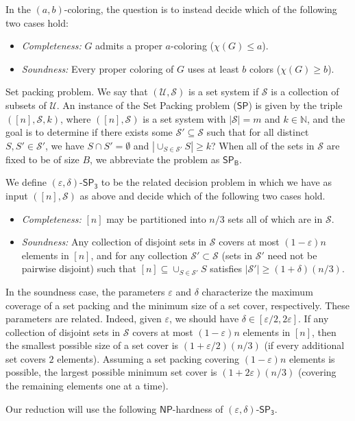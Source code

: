 \documentclass{theoretics}
\newcommand{\1}{\textbf{1}}
\newcommand{\setp}{$\mathsf{SP}$\xspace}
\newcommand{\setpT}{$\mathsf{SP_3}$\xspace}
\newcommand{\setpB}{$\mathsf{SP_B}$\xspace}
\newcommand{\np}{$\mathsf{NP}$\xspace}
\begin{document}
In the $(a, b)$-coloring, the question is to instead decide which of the following two cases hold:
\begin{itemize}
    \item \textit{Completeness:} $G$ admits a proper $a$-coloring ($\chi(G) \leq a$).
    \item \textit{Soundness:} Every proper coloring of $G$ uses at least $b$ colors  ($\chi(G) \geq b$).
\end{itemize}

\begin{paragraph}{Set packing problem.}
We say that $(\mathcal{U}, \mathcal{S})$ is a set system if $\mathcal{S}$ is a collection of subsets of $\mathcal{U}$.
An instance of the Set Packing problem (\setp) is given by the triple $([n], \mathcal{S}, k)$, where $([n], \mathcal{S})$ is a set system with $|\mathcal{S}| = m$ and $k \in \mathbb{N}$, and the goal is to determine if there exists some $\mathcal{S}' \subseteq \mathcal{S}$ such that for all distinct $S, S' \in \mathcal{S}'$, we have $S \cap S' = \emptyset$ and   $|\cup_{S \in \mathcal{S}'} S| \geq k$? When all of the sets in $\mathcal{S}$ are fixed to be of size $B$, we abbreviate the problem as \setpB. 

We define $(\varepsilon, \delta)$-\setpT to be the related decision problem in which we have as input $([n], \mathcal{S})$ as above and decide which of the following two cases hold.
\begin{itemize}
    \item \textit{Completeness:} $[n]$ may be partitioned into $n/3$ sets all of which are in $\mathcal{S}$.
    \item \textit{Soundness:} Any collection of disjoint sets in $\mathcal{S}$ covers at most $(1-\varepsilon)n$ elements in $[n]$, and for any collection $\mathcal{S}' \subset \mathcal{S}$ (sets in $\mathcal{S}'$ need not be pairwise disjoint) such that $[n] \subseteq \cup_{S \in \mathcal{S}'} S$ satisfies $|\mathcal{S}'| \geq (1 + \delta)(n/3)$.
\end{itemize}


\begin{remark}In the soundness case, the parameters $\varepsilon$ and $\delta$ characterize the maximum coverage of a set packing and the minimum size of a set cover, respectively. These parameters are related. Indeed, given $\varepsilon$, we should have $\delta \in [\varepsilon/2, 2\varepsilon]$. If any collection of disjoint sets in $\mathcal{S}$ covers at most $(1-\varepsilon)n$ elements in $[n]$, then the smallest possible size of a set cover is $(1 + \varepsilon/2)(n/3)$ (if every additional set covers $2$ elements). Assuming a set packing covering $(1-\varepsilon)n$ elements is possible, the largest possible minimum set cover is $(1 + 2\varepsilon)(n/3)$ (covering the remaining elements one at a time).  \label{rem:epsdelta}\end{remark}
Our reduction will use the following \np-hardness of $(\varepsilon, \delta)$-\setpT. 



\end{paragraph}
\end{document}
